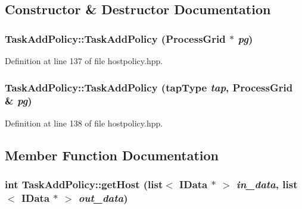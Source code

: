 \subsection{Constructor \& Destructor Documentation}
\hypertarget{class_task_add_policy_ac1a8ac8ea73840de78c4f82df7b58895}{
\subsubsection[{TaskAddPolicy}]{\setlength{\rightskip}{0pt plus 5cm}TaskAddPolicy::TaskAddPolicy ({\bf ProcessGrid} $\ast$ {\em pg})}}
\label{class_task_add_policy_ac1a8ac8ea73840de78c4f82df7b58895}


Definition at line 137 of file hostpolicy.hpp.\hypertarget{class_task_add_policy_a89b4e830d38115ef42d915c898d58268}{
\subsubsection[{TaskAddPolicy}]{\setlength{\rightskip}{0pt plus 5cm}TaskAddPolicy::TaskAddPolicy ({\bf tapType} {\em tap}, \/  {\bf ProcessGrid} \& {\em pg})}}
\label{class_task_add_policy_a89b4e830d38115ef42d915c898d58268}


Definition at line 138 of file hostpolicy.hpp.

\subsection{Member Function Documentation}
\hypertarget{class_task_add_policy_af4a2055c79d1605f4099bdec7f4429f2}{
\subsubsection[{getHost}]{\setlength{\rightskip}{0pt plus 5cm}int TaskAddPolicy::getHost (list$<$ {\bf IData} $\ast$ $>$ {\em in\_\-data}, \/  list$<$ {\bf IData} $\ast$ $>$ {\em out\_\-data})}}
\label{class_task_add_policy_af4a2055c79d1605f4099bdec7f4429f2}


